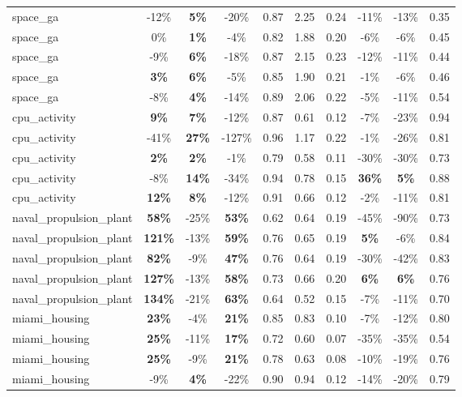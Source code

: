 \begin{table}[!htbp]
\begin{small}
\begin{sc}
{\begin{tabular}{lccccccccc}
space\_ga & -12\% & \textbf{5\%} & -20\% & 0.87 & 2.25 & 0.24 & -11\% & -13\% & 0.35 \\
space\_ga & 0\% & \textbf{1\%} & -4\% & 0.82 & 1.88 & 0.20 & -6\% & -6\% & 0.45 \\
space\_ga & -9\% & \textbf{6\%} & -18\% & 0.87 & 2.15 & 0.23 & -12\% & -11\% & 0.44 \\
space\_ga & \textbf{3\%} & \textbf{6\%} & -5\% & 0.85 & 1.90 & 0.21 & -1\% & -6\% & 0.46 \\
space\_ga & -8\% & \textbf{4\%} & -14\% & 0.89 & 2.06 & 0.22 & -5\% & -11\% & 0.54 \\
cpu\_activity & \textbf{9\%} & \textbf{7\%} & -12\% & 0.87 & 0.61 & 0.12 & -7\% & -23\% & 0.94 \\
cpu\_activity & -41\% & \textbf{27\%} & -127\% & 0.96 & 1.17 & 0.22 & -1\% & -26\% & 0.81 \\
cpu\_activity & \textbf{2\%} & \textbf{2\%} & -1\% & 0.79 & 0.58 & 0.11 & -30\% & -30\% & 0.73 \\
cpu\_activity & -8\% & \textbf{14\%} & -34\% & 0.94 & 0.78 & 0.15 & \textbf{36\%} & \textbf{5\%} & 0.88 \\
cpu\_activity & \textbf{12\%} & \textbf{8\%} & -12\% & 0.91 & 0.66 & 0.12 & -2\% & -11\% & 0.81 \\
naval\_propulsion\_plant & \textbf{58\%} & -25\% & \textbf{53\%} & 0.62 & 0.64 & 0.19 & -45\% & -90\% & 0.73 \\
naval\_propulsion\_plant & \textbf{121\%} & -13\% & \textbf{59\%} & 0.76 & 0.65 & 0.19 & \textbf{5\%} & -6\% & 0.84 \\
naval\_propulsion\_plant & \textbf{82\%} & -9\% & \textbf{47\%} & 0.76 & 0.64 & 0.19 & -30\% & -42\% & 0.83 \\
naval\_propulsion\_plant & \textbf{127\%} & -13\% & \textbf{58\%} & 0.73 & 0.66 & 0.20 & \textbf{6\%} & \textbf{6\%} & 0.76 \\
naval\_propulsion\_plant & \textbf{134\%} & -21\% & \textbf{63\%} & 0.64 & 0.52 & 0.15 & -7\% & -11\% & 0.70 \\
miami\_housing & \textbf{23\%} & -4\% & \textbf{21\%} & 0.85 & 0.83 & 0.10 & -7\% & -12\% & 0.80 \\
miami\_housing & \textbf{25\%} & -11\% & \textbf{17\%} & 0.72 & 0.60 & 0.07 & -35\% & -35\% & 0.54 \\
miami\_housing & \textbf{25\%} & -9\% & \textbf{21\%} & 0.78 & 0.63 & 0.08 & -10\% & -19\% & 0.76 \\
miami\_housing & -9\% & \textbf{4\%} & -22\% & 0.90 & 0.94 & 0.12 & -14\% & -20\% & 0.79 \\

\end{tabular}}
\end{sc}
\end{small}
\end{table}
